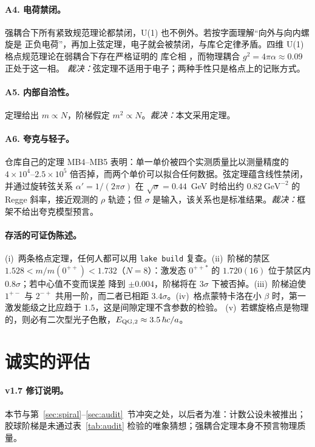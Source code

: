 \documentclass[aps,prd,preprint,superscriptaddress,amsmath,amssymb]{revtex4-2}
\begin{document}
\paragraph{A4. 电荷禁闭。}强耦合下所有紧致规范理论都禁闭，U(1) 也不例外。若按字面理解``向外与向内螺旋是
正负电荷''，再加上弦定理，电子就会被禁闭，与库仑定律矛盾。四维 U(1) 格点规范理论在弱耦合下存在严格证明的
库仑相 \cite{guth1980existence,frohlich1982massless}，而物理耦合 $g^2=4\pi\alpha\approx0.09$ 正处于这一相。
\emph{裁决：}弦定理不适用于电子；两种手性只是格点上的记账方式。

\paragraph{A5. 内部自洽性。}定理给出 $m\propto N$，阶梯假定 $m^2\propto N$。\emph{裁决：}本文采用定理。

\paragraph{A6. 夸克与轻子。}仓库自己的定理 MB4--MB5 表明：单一单价被四个实测质量比以测量精度的
$4\times10^4$--$2.5\times10^5$ 倍否掉，而两个单价可以拟合任何数据。弦定理蕴含线性禁闭，并通过旋转弦关系
$\alpha'=1/(2\pi\sigma)$ 在 $\sqrt\sigma=0.44$~GeV 时给出约 $0.82~\text{GeV}^{-2}$ 的 Regge 斜率，接近观测的
$\rho$ 轨迹；但 $\sigma$ 是输入，该关系也是标准结果。\emph{裁决：}框架不给出夸克模型预言。

\paragraph{存活的可证伪陈述。}(i)~两条格点定理，任何人都可以用 \texttt{lake build} 复查。(ii)~阶梯的禁区
$1.528<m/m(0^{++})<1.732$（$N=8$）：激发态 $0^{++*}$ 的 $1.720(16)$ 位于禁区内 $0.8\sigma$；若中心值不变而误差
降到 $\pm0.004$，阶梯将在 $3\sigma$ 下被否掉。(iii)~阶梯迫使 $1^{+-}$ 与 $2^{-+}$ 共用一阶，而二者已相距
$3.4\sigma$。(iv)~格点蒙特卡洛在小 $\beta$ 时，第一激发能级之比应趋于 $1.5$，这是间隙定理不含参数的检验。
(v)~若螺旋格点是物理的，则必有二次型光子色散，$E_{\rm QG,2}\approx3.5\,\hbar c/a$。

\section{诚实的评估}
\label{sec:honest}

\paragraph{v1.7 修订说明。}本节与第~\ref{sec:spiral}--\ref{sec:audit}~节冲突之处，以后者为准：计数公设未被推出；胶球阶梯是未通过表~\ref{tab:audit} 检验的唯象猜想；强耦合定理本身不预言物理质量。
\end{document}

